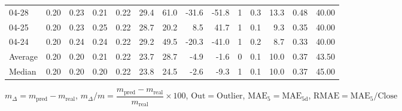 \begin{threeparttable}
{\begin{tabular}{lrrrrrrrrrrrrr}
  04-28 &          0.20 &          0.23 &          0.21 &        0.22 &                29.4 &                61.0 &      -31.6 &        -51.8 &              1 &                 0.3 &             13.3 &            0.48 &                  40.00 \\
  04-25 &          0.20 &          0.23 &          0.25 &        0.22 &                28.7 &                20.2 &        8.5 &         41.7 &              1 &                 0.1 &              9.3 &            0.35 &                  40.00 \\
  04-24 &          0.20 &          0.24 &          0.24 &        0.22 &                29.2 &                49.5 &      -20.3 &        -41.0 &              1 &                 0.2 &              8.7 &            0.33 &                  40.00 \\
Average &          0.20 &          0.20 &          0.21 &        0.22 &                23.7 &                28.7 &       -4.9 &         -1.6 &              0 &                 0.1 &             10.0 &            0.37 &                  43.50 \\
 Median &          0.20 &          0.20 &          0.20 &        0.22 &                23.8 &                24.5 &       -2.6 &         -9.3 &              1 &                 0.1 &             10.0 &            0.37 &                  45.00 \\
\bottomrule
\end{tabular}
}
\begin{tablenotes}\footnotesize
\item $m_\Delta=m_{\text{pred}}-m_{\text{real}}$,
$m_\Delta/m=\dfrac{m_{\text{pred}}-m_{\text{real}}}{m_{\text{real}}}\times100$,
$\mathrm{Out}=\text{Outlier}$,
$\mathrm{MAE}_5=\mathrm{MAE}_{5\text{d}}$,
$\mathrm{RMAE}=\mathrm{MAE}_5/\text{Close}$
\end{tablenotes}
\end{threeparttable}
\endgroup


